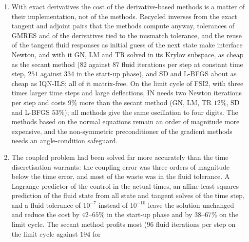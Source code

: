 \documentclass[11pt,a4paper]{article}
\theoremstyle{definition}
\theoremstyle{remark}
\begin{document}
\begin{enumerate}
be removed first: a mode of about $300$~Hz that grows for small time steps unless the structure
integrator dissipates at $\omega\Delta t\approx0.6$ (Bossak with $\rho_\infty=0$), and the
degeneration of the fluid mesh at large deflections (high-order mapping, mesh motion not
stiffened near the flag). During the growth
of the instability the trajectory depends on round-off-level perturbations; the Dirichlet--Neumann
iteration then needs accurate fluid solves to be reproducible, whereas the secant method is
insensitive to the fluid tolerances. Stopping criteria must lie above the noise floor of the state
map (relative tolerance, stagnation stop); IQN-ILS needs the newest-first ordering of its secant
columns to be robust in the start-up phase.
\item With exact derivatives the cost of the derivative-based methods is a matter of their
implementation, not of the methods. Recycled inverses from the exact tangent and adjoint pairs that
the methods compute anyway, tolerances of GMRES and of the derivatives tied to the mismatch
tolerance, and the reuse of the tangent fluid responses as initial guess of the next state make
interface Newton, and with it GN, LM and TR solved in its Krylov subspace, as cheap as the secant
method ($82$ against $87$ fluid iterations per step at constant time step, $251$ against $334$ in
the start-up phase), and SD and L-BFGS about as cheap as IQN-ILS; all of it matrix-free. On the
limit cycle of FSI2, with three times larger time steps and large deflections, IN needs two Newton
iterations per step and costs $9\%$ more than the secant method (GN, LM, TR $12\%$, SD and L-BFGS
$53\%$); all methods give the same oscillation to four digits. The
methods based on the normal equations remain an order of magnitude more expensive, and the
non-symmetric preconditioner of the gradient methods needs an angle-condition safeguard.
\item The coupled problem had been solved far more accurately than the time discretisation
warrants: the coupling error was three orders of magnitude below the time error, and most of the
waste was in the fluid tolerance. A Lagrange predictor of the control in the actual times, an
affine least-squares prediction of the fluid state from all state and tangent solves of the time
step, and a fluid tolerance of $10^{-7}$ instead of $10^{-10}$ leave the solution unchanged and
reduce the cost by $42$--$65\%$ in the start-up phase and by $38$--$67\%$ on the limit cycle. The
secant method profits most ($96$ fluid iterations per step on the limit cycle against $194$ for

\end{enumerate}
\end{document}

